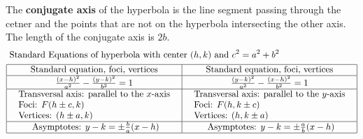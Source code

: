 \documentclass{report}
\begin{document}
\noindent The \textbf{conjugate axis} of the hyperbola is the line segment passing through the cetner and the points that are not on the hyperbola intersecting the other axis. The length of the conjugate axis is $2b$.
\bigbreak \noindent \bigbreak \noindent
\begin{align*}
&\text { Standard Equations of hyperbola with center }(h, k) \text { and } c^2=a^2+b^2\\
&\begin{array}{|c|c|}
\hline \text { Standard equation, foci, vertices } & \text { Standard equation, foci, vertices } \\
\hline \frac{\left(x-h\right)^2}{a^{2}} - \frac{\left(y-k\right)^2}{b^2} = 1 &  \frac{(y-k)^2}{a^2}-\frac{(x-h)^2}{b^2}=1 \\ 
\hline \begin{array}{l}
\text { Transversal axis: parallel to the } x \text {-axis } \\
\text { Foci: } F(h \pm c, k) \\
\text { Vertices: }(h \pm a, k)
\end{array} & \begin{array}{l}
\text { Transversal axis: parallel to the } y \text {-axis } \\
\text { Foci: } F(h, k \pm c) \\
\text { Vertices: }(h, k \pm a)
\end{array} \\
\hline \text { Asymptotes: } y-k= \pm \frac{b}{a}(x-h) & \text { Asymptotes: } y-k= \pm \frac{a}{b}(x-h) \\
\hline
\end{array}
\end{align*}
\bigbreak \noindent \bigbreak \noindent
{}
\bigbreak \noindent \bigbreak \noindent \bigbreak \noindent \bigbreak \noindent
\end{document}
